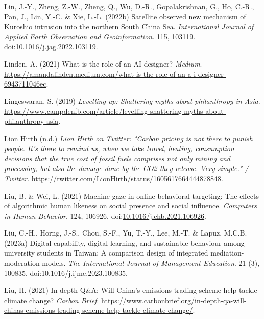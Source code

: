 \documentclass[
  letterpaper,
  DIV=11,
  numbers=noendperiod]{scrartcl}
\newlength{\cslhangindent}
\newenvironment{CSLReferences}[2] %
 {\begin{list}{}{%
  \setlength{\itemindent}{0pt}
  \setlength{\leftmargin}{0pt}
  \setlength{\parsep}{0pt}
  \ifodd #1
   \setlength{\leftmargin}{\cslhangindent}
   \setlength{\itemindent}{-1\cslhangindent}
  \fi
  \setlength{\itemsep}{#2\baselineskip}}}
 {\end{list}}
\begin{document}
\begin{CSLReferences}{0}{1}
Lin, J.-Y., Zheng, Z.-W., Zheng, Q., Wu, D.-R., Gopalakrishnan, G., Ho,
C.-R., Pan, J., Lin, Y.-C. \& Xie, L.-L. (2022b) Satellite observed new
mechanism of {Kuroshio} intrusion into the northern {South China Sea}.
\emph{International Journal of Applied Earth Observation and
Geoinformation}. 115, 103119.
doi:\href{https://doi.org/10.1016/j.jag.2022.103119}{10.1016/j.jag.2022.103119}.

Linden, A. (2021) What is the role of an {AI} designer? \emph{Medium}.
\url{https://amandalinden.medium.com/what-is-the-role-of-an-a-i-designer-6943711046ec}.

Lingeswaran, S. (2019) \emph{Levelling up: {Shattering} myths about
philanthropy in {Asia}}.
\url{https://www.campdenfb.com/article/levelling-shattering-myths-about-philanthropy-asia}.

Lion Hirth (n.d.) \emph{Lion {Hirth} on {Twitter}: "{Carbon} pricing is
not there to punish people. {It}'s there to remind us, when we take
travel, heating, consumption decisions that the true cost of fossil
fuels comprises not only mining and processing, but also the damage done
by the {CO2} they release. {Very} simple." / {Twitter}}.
\url{https://twitter.com/LionHirth/status/1605617664444878848}.

Liu, B. \& Wei, L. (2021) Machine gaze in online behavioral targeting:
{The} effects of algorithmic human likeness on social presence and
social influence. \emph{Computers in Human Behavior}. 124, 106926.
doi:\href{https://doi.org/10.1016/j.chb.2021.106926}{10.1016/j.chb.2021.106926}.

Liu, C.-H., Horng, J.-S., Chou, S.-F., Yu, T.-Y., Lee, M.-T. \& Lapuz,
M.C.B. (2023a) Digital capability, digital learning, and sustainable
behaviour among university students in {Taiwan}: {A} comparison design
of integrated mediation-moderation models. \emph{The International
Journal of Management Education}. 21 (3), 100835.
doi:\href{https://doi.org/10.1016/j.ijme.2023.100835}{10.1016/j.ijme.2023.100835}.

Liu, H. (2021) In-depth {Q}\&{A}: {Will China}'s emissions trading
scheme help tackle climate change? \emph{Carbon Brief}.
\url{https://www.carbonbrief.org/in-depth-qa-will-chinas-emissions-trading-scheme-help-tackle-climate-change/}.


\end{CSLReferences}
\end{document}
